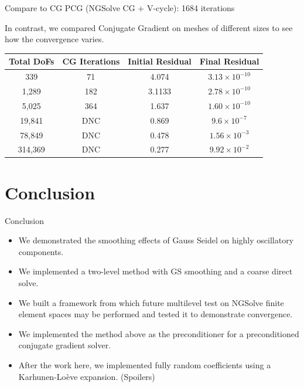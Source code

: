 \documentclass[aspectratio=169,11pt]{beamer}
\begin{document}
\begin{centering}
\begin{frame}{Compare to CG}
  PCG (NGSolve CG + V-cycle): 1684 iterations
   
  In contrast, we compared Conjugate Gradient on meshes of different sizes to see how the convergence varies.

  \begin{tabular}{|c|c|c|c|}
    \hline
    Total DoFs & CG Iterations & Initial Residual & Final Residual\\
    \hline
    339 & 71 & 4.074 & \( 3.13 \times 10^{-10} \)\\
    1,289 & 182 & 3.1133 & \( 2.78 \times 10^{-10} \)\\
    5,025 & 364 & 1.637 & \( 1.60 \times 10^{-10} \)\\
    19,841 & DNC & 0.869 & \( 9.6 \times 10^{-7} \)\\
    78,849 & DNC & 0.478 & \( 1.56 \times 10^{-3} \) \\
    314,369 & DNC & 0.277 & \( 9.92 \times 10^{-2} \)\\
    \hline
  \end{tabular}

\end{frame}

\section{Conclusion}
\begin{frame}{Conclusion}
  \begin{itemize}
    \item We demonstrated the smoothing effects of Gauss Seidel on highly oscillatory components.
    \item We implemented a two-level method with GS smoothing and a coarse direct solve.
    \item We built a framework from which future multilevel test on NGSolve finite element spaces may be performed and tested it to demonstrate convergence.
    \item We implemented the method above as the preconditioner for a preconditioned conjugate gradient solver.
    \item After the work here, we implemented fully random coefficients using a Karhunen-Lo\`{e}ve expansion. (Spoilers)
  \end{itemize}
\end{frame}
\end{centering}
\end{document}
